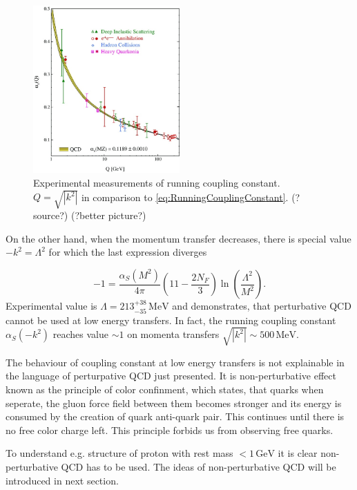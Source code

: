 \documentclass[a4paper,11pt]{report}
\newcommand{\GeV}{\,\text{GeV}}
\newcommand{\MeV}{\,\text{MeV}}
\begin{document}
\begin{figure}[t]
  \centering
  \includegraphics[width=0.5\textwidth]{Chapter1/RunningCouplingConstant.jpg}
  \caption{Experimental measurements of running coupling constant.
    $Q=\sqrt{\left|k^2\right|}$ in comparison to
    \eqref{eq:RunningCouplingConstant}. (?source?) (?better picture?)}
  \label{fig:RunningCouplingConstant}
\end{figure}

On the other hand, when the momentum transfer decreases, there is special value
$-k^2=\Lambda^2$ for which the last expression diverges

\begin{equation}
  -1 = \frac{\alpha_S(M^2)}{4\pi} \left( 11 - \frac{2N_F}{3} \right)
  \ln \left( \frac{\Lambda^2}{M^2} \right).
  \label{eq:RunningLambda}
\end{equation}
Experimental value is $\Lambda=213^{+38}_{-35}\MeV$ \cite{wiki:QCDHistory} and demonstrates, that
perturbative QCD cannot be used at low energy transfers. In fact, the running
coupling constant $\alpha_S(-k^2)$ reaches value $\sim 1$ on momenta
transfers $\sqrt{\left| k^2 \right|} \sim 500\MeV$. 

The behaviour of coupling constant at low energy transfers is not explainable in
the language of perturpative QCD just presented. It is non-perturbative effect
known as the principle of color confinment, which states, that quarks when
seperate, the gluon force field between them becomes stronger and its energy is
consumed by the creation of quark anti-quark pair. This continues until there is
no free color charge left. This principle forbids us from observing free quarks.

To understand e.g. structure of proton with rest mass $< 1\GeV$ it is clear
non-perturbative QCD has to be used. The ideas of non-perturbative QCD will be
introduced in next section. 
\end{document}
